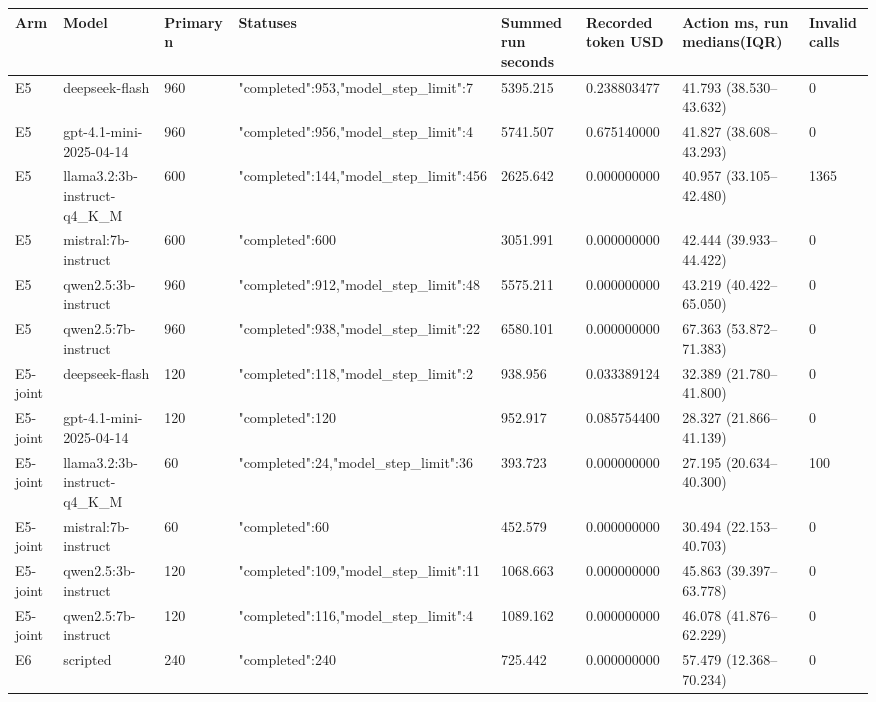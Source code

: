 \begin{tabular}{llllllll}
\hline
Arm & Model & Primary n & Statuses & Summed run seconds & Recorded token USD & Action ms, run medians(IQR) & Invalid calls \\
\hline
E5 & deepseek-flash & 960 & {"completed":953,"model\_step\_limit":7} & 5395.215 & 0.238803477 & 41.793 (38.530--43.632) & 0 \\
E5 & gpt-4.1-mini-2025-04-14 & 960 & {"completed":956,"model\_step\_limit":4} & 5741.507 & 0.675140000 & 41.827 (38.608--43.293) & 0 \\
E5 & llama3.2:3b-instruct-q4\_K\_M & 600 & {"completed":144,"model\_step\_limit":456} & 2625.642 & 0.000000000 & 40.957 (33.105--42.480) & 1365 \\
E5 & mistral:7b-instruct & 600 & {"completed":600} & 3051.991 & 0.000000000 & 42.444 (39.933--44.422) & 0 \\
E5 & qwen2.5:3b-instruct & 960 & {"completed":912,"model\_step\_limit":48} & 5575.211 & 0.000000000 & 43.219 (40.422--65.050) & 0 \\
E5 & qwen2.5:7b-instruct & 960 & {"completed":938,"model\_step\_limit":22} & 6580.101 & 0.000000000 & 67.363 (53.872--71.383) & 0 \\
E5-joint & deepseek-flash & 120 & {"completed":118,"model\_step\_limit":2} & 938.956 & 0.033389124 & 32.389 (21.780--41.800) & 0 \\
E5-joint & gpt-4.1-mini-2025-04-14 & 120 & {"completed":120} & 952.917 & 0.085754400 & 28.327 (21.866--41.139) & 0 \\
E5-joint & llama3.2:3b-instruct-q4\_K\_M & 60 & {"completed":24,"model\_step\_limit":36} & 393.723 & 0.000000000 & 27.195 (20.634--40.300) & 100 \\
E5-joint & mistral:7b-instruct & 60 & {"completed":60} & 452.579 & 0.000000000 & 30.494 (22.153--40.703) & 0 \\
E5-joint & qwen2.5:3b-instruct & 120 & {"completed":109,"model\_step\_limit":11} & 1068.663 & 0.000000000 & 45.863 (39.397--63.778) & 0 \\
E5-joint & qwen2.5:7b-instruct & 120 & {"completed":116,"model\_step\_limit":4} & 1089.162 & 0.000000000 & 46.078 (41.876--62.229) & 0 \\
E6 & scripted & 240 & {"completed":240} & 725.442 & 0.000000000 & 57.479 (12.368--70.234) & 0 \\
\hline
\end{tabular}
